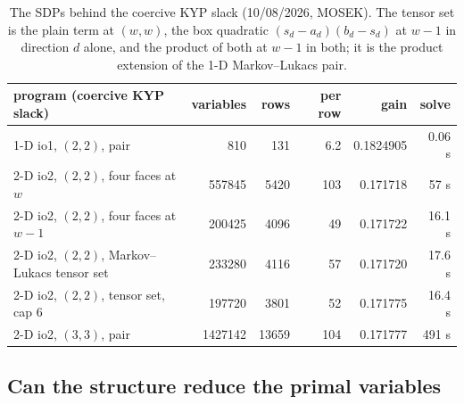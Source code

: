 \documentclass[12pt]{article}
\theoremstyle{plain}
\theoremstyle{definition}
\theoremstyle{remark}
\begin{document}
\begin{table}[h]\centering\footnotesize
\setlength{\tabcolsep}{5pt}
\begin{tabular}{lrrrrr}
\toprule
program (coercive KYP slack) & variables & rows & per row & gain & solve \\
\midrule
1-D io1, $(2,2)$, pair & 810 & 131 & 6.2 & 0.1824905 & 0.06 s \\
2-D io2, $(2,2)$, four faces at $w$ & 557845 & 5420 & 103 & 0.171718 & 57 s \\
2-D io2, $(2,2)$, four faces at $w-1$ & 200425 & 4096 & 49 & 0.171722 & 16.1 s \\
2-D io2, $(2,2)$, Markov--Lukacs tensor set & 233280 & 4116 & 57 & 0.171720 & 17.6 s \\
2-D io2, $(2,2)$, tensor set, cap 6 & 197720 & 3801 & 52 & 0.171775 & 16.4 s \\
2-D io2, $(3,3)$, pair & 1427142 & 13659 & 104 & 0.171777 & 491 s \\
\bottomrule
\end{tabular}
\caption{The SDPs behind the coercive KYP slack (10/08/2026, MOSEK). The tensor set is the plain term at $(w,w)$, the box quadratic $(s_d-a_d)(b_d-s_d)$ at $w-1$ in direction $d$ alone, and the product of both at $w-1$ in both; it is the product extension of the 1-D Markov--Lukacs pair.}\label{tab:sdpsize}
\end{table}

\subsection{Can the structure reduce the primal variables}
\end{document}
